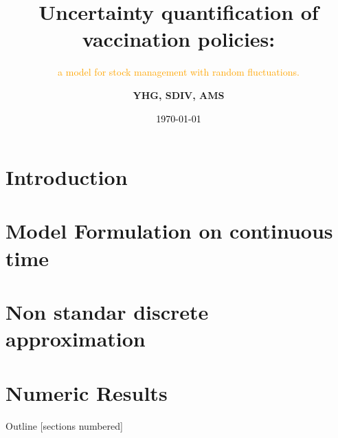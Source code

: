 \documentclass[texcoord,
    10pt]{beamer}
\title{Uncertainty quantification of vaccination policies:
}%
\subtitle{%
        \textcolor{orange}{%
            a model for stock management with random fluctuations.
        }
    }
\date{\textcolor{black}{\today}}
\author{\bf
        YHG, SDIV, AMS
    }
\institute{
        \textcolor{verde}{
            UNACH,
            CONACYT-Universidad de Sonora,
            Universidad de Sonora
        }
    }
\begin{document}
    \maketitle
     \section*{Introduction}
         
     \section{Model Formulation on continuous time}
         
     \section{Non standar discrete approximation}
         
     \section{Numeric Results}
        
     \begin{frame}{Outline}
         \hypersetup{linkcolor=black}
         [sections numbered]
         \tableofcontents
     \end{frame}
\end{document}
